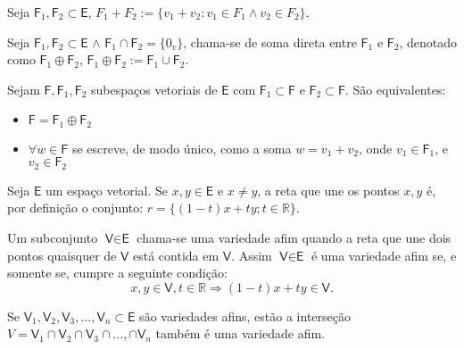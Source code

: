 \documentclass[10pt,a4paper]{article}
\begin{document}
\begin{definition}
	Seja $\textsf{F}_1, \textsf{F}_2 \subset \textsf{E}$, $F_1 + F_2 := \{ v_1 + v_2 : v_1 \in F_1 \land v_2 \in F_2 \}$.
\end{definition}
\par
\begin{definition}
	Seja $\textsf{F}_1, \textsf{F}_2 \subset \textsf{E}$ $\land$ $\textsf{F}_1 \cap \textsf{F}_2 = \{0_v\}$, chama-se de soma direta entre $\textsf{F}_1$ e $\textsf{F}_2$, denotado como $\textsf{F}_1 \oplus \textsf{F}_2$, $\textsf{F}_1 \oplus \textsf{F}_2 := \textsf{F}_1 \cup \textsf{F}_2$.
\end{definition}

\begin{theorem}
	Sejam $\textsf{F}, \textsf{F}_1, \textsf{F}_2$ subespaços vetoriais de $\textsf{E}$ com $\textsf{F}_1 \subset \textsf{F}$ e $\textsf{F}_2 \subset \textsf{F}$. São equivalentes:
	\begin{itemize}
		\item $\textsf{F} = \textsf{F}_1 \oplus \textsf{F}_2$
		\item $\forall w \in \textsf{F} $ se escreve, de modo único, como a soma $w = v_1 + v_2$, onde $v_1 \in \textsf{F}_1$, e $v_2 \in \textsf{F}_2$
	\end{itemize}
\end{theorem}	

\begin{definition}
	Seja $\textsf{E}$ um espaço vetorial. Se $x, y \in \textsf{E}$ e $x \neq y$, a reta que une os pontos $x, y$ é, por definição o conjunto: $r = \{(1 - t)x + ty; t \in \mathbb{R}\}$.
\end{definition}

\begin{definition}
	Um subconjunto $\textsf{V} \in \textsf{E}$ chama-se uma variedade afim quando a reta que une dois pontos quaisquer de $\textsf{V}$ está contida em $\textsf{V}$. Assim $\textsf{V} \in \textsf{E}$ é uma variedade afim se, e somente se, cumpre a seguinte condição:
	\[
		x, y \in \textsf{V}, t \in \mathbb{R} \Rightarrow (1 - t)x + ty \in \textsf{V}.
	\]
\end{definition}

\begin{theorem}
	Se $\textsf{V}_1, \textsf{V}_2, \textsf{V}_3, \dots, \textsf{V}_n  \subset \textsf{E}$ são variedades afins, estão a interseção $V = \textsf{V}_1 \cap \textsf{V}_2 \cap \textsf{V}_3 \cap \dots, \cap \textsf{V}_n$ também é uma variedade afim.
\end{theorem}
\end{document}
